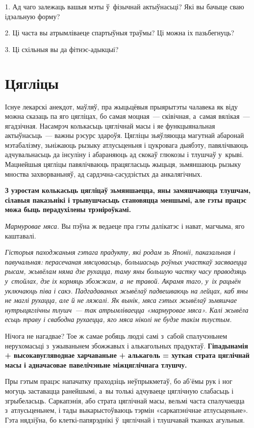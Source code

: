 1. Ад чаго залежаць вашыя мэты ў~фізычнай актыўнасьці? Які вы бачыце сваю ідэальную форму?

2. Ці часта вы атрымліваеце спартыўныя траўмы? Ці можна іх пазьбегнуць?

3. Ці схільныя вы да фітнэс-адыкцыі?


\section{Цягліцы}

Існуе лекарскі анекдот, маўляў, пра жыцьцёвыя прыярытэты чалавека як віду можна сказаць па яго цягліцах, бо самая моцная~--- сківічная, а~самая вялікая~--- ягадзічная. Насамрэч колькасьць цяглічнай масы і яе функцыянальная актыўнасьць~--- важны рэсурс здароўя. Цягліцы зьяўляюцца магутнай абаронай мэтабалізму, зьніжаюць рызыку атлусьценьня і цукровага дыябэту, павялічваюць адчувальнасьць да інсуліну і абараняюць ад скокаў глюкозы і тлушчаў у~крыві. Мацнейшыя цягліцы павялічваюць працягласьць жыцьця, зьмяншаюць рызыку мноства захворваньняў, ад сардэчна-сасудзістых да анкалягічных. 

\textbf{З узростам колькасьць цягліцаў зьмяншаецца, яны замяшчаюцца тлушчам, сілавыя паказьнікі і трывушчасьць становяцца меншымі, але гэты працэс можа быць перадухілены трэніроўкамі.}

\emph{Мармуровае мяса.} Вы пэўна ж ведаеце пра гэты далікатэс і нават, магчыма, яго каштавалі. 

\emph{Гісторыя паходжаньня гэтага прадукту, які родам зь Японіі, паказальная і павучальная: перасечаная мясцовасьць, большасьць роўных участкаў засяваецца рысам, жывёлам няма дзе рухацца, таму яны большую частку часу праводзяць у~стойлах, дзе іх кормяць збожжам, а~не травой. Акрамя таго, у~іх рацыён уключаюць піва і сакэ. Падгадаваных жывёлаў падвешваюць на лейцах, каб яны не маглі рухацца, але й не ляжалі. Як вынік, мяса гэтых жывёлаў зьмяшчае нутрыцяглічны тлушч~--- так атрымліваецца «мармуровае мяса». Калі жывёла есьць траву і свабодна рухаецца, яго мяса ніколі не будзе такім тлустым.}

Нічога не нагадвае? Тое ж самае робяць людзі самі з~сабой спалучэньнем нерухомасьці з~ужываньнем збожжавых і алькагольных прадуктаў. \textbf{Гіпадынамія + высокавугляводнае харчаваньне + алькаголь = хуткая страта цяглічнай масы і адначасовае павелічэньне міжцяглічнага тлушчу.}

Пры гэтым працэс напачатку праходзіць неўпрыкметаў, бо аб'ёмы рук і ног могуць заставацца ранейшымі, а~вы толькі адчуваеце цяглічную слабасьць і згрыбеласьць. Саркапэнія, або страта цяглічнай масы, вельмі часта спалучаецца з~атлусьценьнем, і тады выкарыстоўваюць тэрмін «саркапэнічнае атлусьценьне». Гэта нядзіўна, бо клеткі-папярэднікі ў~цяглічнай і тлушчавай тканках агульныя.

